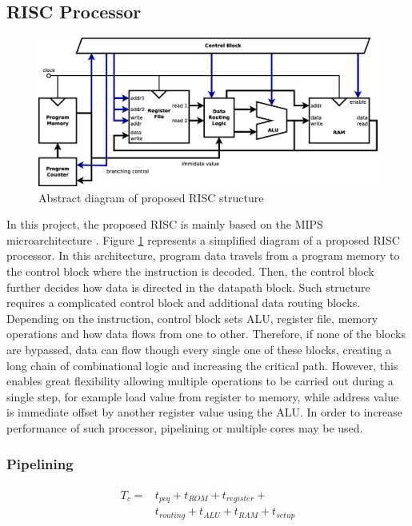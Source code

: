 \subsection{RISC Processor}

\begin{figure}[t!]
	\centering
	\includegraphics[width=\linewidth]{../resources/risc.eps}
	\caption{Abstract diagram of proposed RISC structure}
	\label{fig:risc_simple}
\end{figure}

In this project, the proposed RISC is mainly based on the MIPS microarchitecture \autocite{harris_harris_2013}. Figure \ref{fig:risc_simple} represents a simplified diagram of a proposed RISC processor. In this architecture, program data travels from a program memory to the control block where the instruction is decoded. Then, the control block further decides how data is directed in the datapath block. Such structure requires a complicated control block and additional data routing blocks. Depending on the instruction, control block sets ALU, register file, memory operations and how data flows from one to other. Therefore, if none of the blocks are bypassed, data can flow though every single one of these blocks, creating a long chain of combinational logic and increasing the critical path. However, this enables great flexibility allowing multiple operations to be carried out during a single step, for example load value from register to memory, while address value is immediate offset by another register value using the ALU. In order to increase performance of such processor, pipelining or multiple cores may be used.

\subsubsection{Pipelining}
\begin{multline}\label{eq:tc}
	\begin{split}
	T_c =& t_{pcq} + t_{ROM} + t_{register} + \\
	 	 & t_{routing} + t_{ALU} + t_{RAM} + t_{setup}
	\end{split}
\end{multline}

